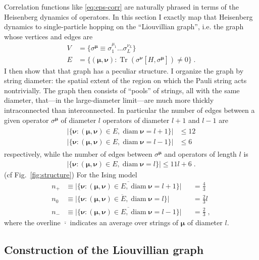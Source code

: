 \documentclass[aps,prb,nofootinbib,twocolumn,balancelastpage,amsmath,amssymb,floatfix,superscriptaddress,]{revtex4-1}
\newcommand{\tr}{\operatorname{Tr}}
\DeclareMathOperator{\diam}{diam}
\begin{document}
Correlation functions like \eqref{eq:eps-corr} are naturally phrased in terms of the Heisenberg dynamics of operators.
In this section I exactly map that Heisenberg dynamics to single-particle hopping on the ``Liouvillian graph'',
i.e. the graph whose vertices and edges are
\begin{align}
  V &= \{ \sigma^{\bm \mu} \equiv \sigma_1^{\mu_1} \dots \sigma^{\nu_L}_L \} \\
  E &= \{ (\bm \mu, \bm \nu) : \tr\left(\sigma^{\bm \nu} [H,\sigma^{\bm \mu}]\right) \ne 0\}\;.
\end{align}
I then show that that graph has a peculiar structure.
I organize the graph by string diameter:
the spatial extent of the region on which the Pauli string acts nontrivially.
The graph then consists of ``pools'' of strings, all with the same diameter, that---in the large-diameter limit---are much more thickly intraconnected than interconnected.
In particular the number of edges between a given operator $\sigma^{\bm \mu}$ of diameter $l$
operators of diameter $l+1$ and $l-1$ are
\begin{align}
  \begin{split}
    |\{\bm \nu  : (\bm \mu ,\bm \nu ) \in E, \diam \bm \nu  = l+1\}| &\le 12\\
    |\{\bm \nu  : (\bm \mu ,\bm \nu ) \in E, \diam \bm \nu  = l-1\}| &\le 6
  \end{split}
\end{align}
respectively, while the number of edges between $\sigma^{\bm \mu}$ and operators of length $l$ is
\begin{align}
  |\{\bm \nu : (\bm \mu, \bm \nu) \in E, \diam \bm \nu = l \}| \le 11l + 6\;.
\end{align}
(cf Fig.~\ref{fig:structure})
For the Ising model
\begin{align}
    n_+ &\equiv \overline{|\{\bm \nu  : (\bm \mu ,\bm \nu ) \in E, \diam \bm \nu  = l+1\}|} &&= \frac 4 3\\
    n_0 &\equiv \overline{|\{\bm \nu  : (\bm \mu ,\bm \nu ) \in E, \diam \bm \nu  = l\}|} &&= \frac 2 3 l\\
    n_- &\equiv \overline{|\{\bm \nu  : (\bm \mu ,\bm \nu ) \in E, \diam \bm \nu  = l-1\}|} &&= \frac 2 3\;,
\end{align}
where the overline $\overline{\cdot}$ indicates an average over strings of $\bm \mu$ of diameter $l$.

\subsection{Construction of the Liouvillian graph}
\end{document}
